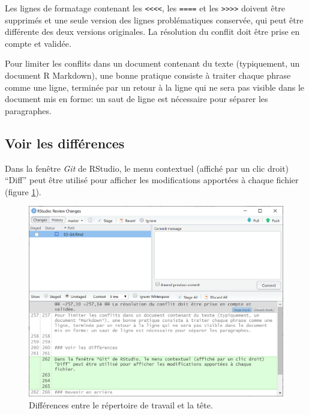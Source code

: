 \documentclass[
  12pt,
  french,
  a4paper,
  extrafontsizes,onecolumn,openright
  ]{memoir}
\begin{document}
Les lignes de formatage contenant les \texttt{\textless{}\textless{}\textless{}\textless{}}, les \texttt{====} et les \texttt{\textgreater{}\textgreater{}\textgreater{}\textgreater{}} doivent être supprimés et une seule version des lignes problématiques conservée, qui peut être différente des deux versions originales.
La résolution du conflit doit être prise en compte et validée.

Pour limiter les conflits dans un document contenant du texte (typiquement, un document R Markdown), une bonne pratique consiste à traiter chaque phrase comme une ligne, terminée par un retour à la ligne qui ne sera pas visible dans le document mis en forme: un saut de ligne est nécessaire pour séparer les paragraphes.

\hypertarget{voir-les-diffuxe9rences}{%
\subsection{Voir les différences}\label{voir-les-diffuxe9rences}}

Dans la fenêtre \emph{Git} de RStudio, le menu contextuel (affiché par un clic droit) \enquote{Diff} peut être utilisé pour afficher les modifications apportées à chaque fichier (figure \ref{fig:git-diff}).



\scriptsize

\begin{figure}

{\centering \includegraphics[width=0.8\linewidth]{images/git-diff} 

}

\caption{Différences entre le répertoire de travail et la tête.}\label{fig:git-diff}
\end{figure}
\end{document}

